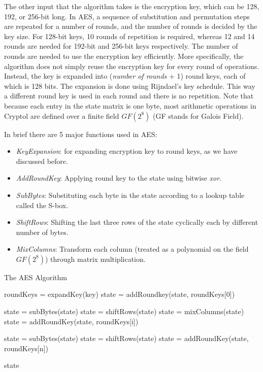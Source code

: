 \documentclass[a4paper, notitlepage]{report}
\begin{document}
The other input that the algorithm takes is the encryption key, which can be 128, 192,
or 256-bit long. In AES, a sequence of substitution and permutation steps are repeated
for a number of rounds, and the number of rounds is decided by the key size.
For 128-bit keys, 10 rounds of repetition is required, whereas 12 and 14 rounds are
needed for 192-bit and 256-bit keys respectively. The number of rounds are needed
to use the encryption key efficiently. More specifically, the algorithm does not
simply reuse the encryption key for every round of operations. Instead, the key is
expanded into (\emph{number of rounds } + 1) round keys, each of which is 128 bits. 
The expansion
is done using Rijndael's key schedule. This way a different round key is used in
each round and there is no repetition. Note that because each entry in the state
matrix is one byte, most arithmetic operations in Cryptol are defined over a finite
field $GF(2^8)$ (GF stands for Galois Field).

In brief there are 5 major functions used in AES:
\begin{itemize}
\item \emph{KeyExpansion}: for expanding encryption key to round keys, as we have
  discussed before.
\item \emph{AddRoundKey}: Applying round key to the state using bitwise \emph{xor}.
\item \emph{SubBytes}: Substituting each byte in the state according to a lookup table
  called the S-box.
\item \emph{ShiftRows}: Shifting the last three rows of the state cyclically each by
  different number of bytes.
\item \emph{MixColumns}: Transform each column (treated as a polynomial on the field
  $GF(2^8)$) through matrix multiplication.
\end{itemize}


\begin{algorithm}
  \caption{The AES Algorithm}
  \label{alg:aes}
  \begin{algorithmic}[1]
    \State roundKeys = expandKey(key)
    \State 
    \State state = addRoundkey(state, roundKeys[0])

    \State state = subBytes(state)
    \State state = shiftRows(state)
    \State state = mixColumns(state)
    \State state = addRoundKey(state, roundKeys[i])
    \EndFor

    \State state = subBytes(state)
    \State state = shiftRows(state)
    \State state = addRoundKey(state, roundKeys[n])
    \State {}

    \State \Return state
    
  \end{algorithmic}
\end{algorithm}
\end{document}
